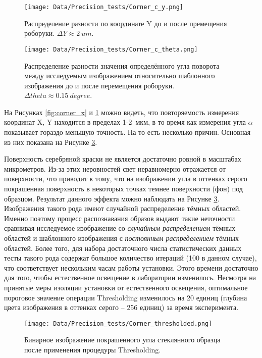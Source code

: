 \begin{figure}[ht]\centering
\texttt{[image: Data/Precision\_tests/Corner\_c\_y.png]}
\caption{Распределение разности по координате Y до и после премещения роборуки. $\Delta Y \approx 2~um$.}
\label{fig:corner_y}
\end{figure}

\begin{figure}[ht]\centering
\texttt{[image: Data/Precision\_tests/Corner\_c\_theta.png]}
\caption{Распределение разности значения определённого угла поворота между исследуемым изображением относительно шаблонного изображения до и после перемещения роборуки. $\Delta theta \approx 0.15 ~degree$. }
\label{fig:corner_theta}
\end{figure}

На Рисунках \ref{fig:corner_x} и \ref{fig:corner_y} можно видеть, что повторяемость измерения координат X, Y находится в пределах 1-2~мкм, в то время как измерения угла $\alpha$ показывает гораздо меньшую точность. На то есть несколько причин. Основная из них показана на Рисунке \ref{fig:corner_threshold}.

Поверхность серебряной краски не является достаточно ровной в масштабах микрометров. Из-за этих неровностей свет неравномерно отражается от поверхности, что приводит к тому, что на изображении угла в оттенках серого покрашенная поверхность в некоторых точках темнее поверхности (фон) под образцом. Результат данного эффекта можно наблюдать на Рисунке \ref{fig:corner_threshold}. Изображения такого рода имеют случайной распределение тёмных областей. Именно поэтому процесс распознавания образов выдают такие неточности сравнивая исследуемое изображение со \emph{случайным распределением} тёмных областей и шаблонного изображения с \emph{постоянным распределением} тёмных областей. Более того, для набора достаточного числа статистических данных тесты такого рода содержат большое количество итераций (100 в данном случае), что соответствует нескольким часам работы установки. Этого времени достаточно для того, чтобы естественное освещение в лаборатории изменилось. Несмотря на принятые меры изоляции установки от естественного освещения, оптимальное пороговое значение операции Thresholding изменилось на 20 единиц (глубина цвета изображения в оттенках серого -- 256 единиц) за время эксперимента.

\begin{figure}[ht]\centering
\texttt{[image: Data/Precision\_tests/Corner\_thresholded.png]}
\caption{Бинарное изображение покрашенного угла стеклянного образца после применения процедуры Thresholding.}
\label{fig:corner_threshold}
\end{figure}

